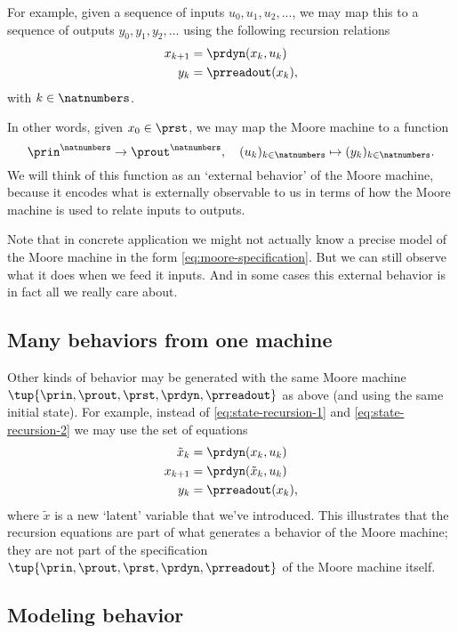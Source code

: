 For example, given a sequence of inputs $u_0, u_1, u_2, ... $, we may map this to a sequence of outputs $y_0, y_1, y_2, ... $ using the following recursion relations
\begin{align}
x_{k+1} &= \prdyn(x_k, u_k) \label{eq:state-recursion-1} \\
y_{k} &= \prreadout(x_{k}), \label{eq:state-recursion-2}
\end{align}
with $k \in \natnumbers$. 

In other words, given $x_0 \in \prst$, we may map the Moore machine \label{eq:moore-again} to a function 
\begin{equation}
\prin^\natnumbers \to \prout^\natnumbers,  \quad (u_k)_{k \in \natnumbers} \mapsto (y_k)_{k \in \natnumbers}. 
\end{equation}
We will think of this function as an `external behavior' of the Moore machine, because it encodes what is externally observable to us in terms of how the Moore machine is used to relate inputs to outputs. 


Note that in concrete application we might not actually know a precise model of the Moore machine in the form \cref{eq:moore-specification}. But we can still observe what it does when we feed it inputs. And in some cases this external behavior is in fact all we really care about. 

\subsection{Many behaviors from one machine}

Other kinds of behavior may be generated with the same Moore machine $\tup{\prin, \prout, \prst, \prdyn, \prreadout}$ as above (and using the same initial state). For example, instead of \cref{eq:state-recursion-1} and \cref{eq:state-recursion-2} we may use the set of equations
\begin{align}
\tilde x_{k} &= \prdyn(x_k, u_k) \\
x_{k+1} &= \prdyn(\tilde x_{k}, u_k) \\
y_{k} &= \prreadout(x_{k}),
\end{align}
where $\tilde x$ is a new `latent' variable that we've introduced. This illustrates that the recursion equations are part of what generates a behavior of the Moore machine; they are not part of the specification $\tup{\prin, \prout, \prst, \prdyn, \prreadout}$ of the Moore machine itself. 




\subsection{Modeling behavior}

